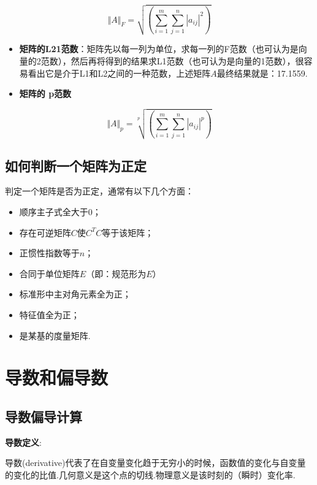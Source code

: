 \[
\Vert A\Vert_F=\sqrt{(\sum_{i=1}^m\sum_{j=1}^n{| a_{ij}|}^2)}
\]

\begin{itemize}
 
\item
  \textbf{矩阵的L21范数}：矩阵先以每一列为单位，求每一列的F范数（也可认为是向量的2范数），然后再将得到的结果求L1范数（也可认为是向量的1范数），很容易看出它是介于L1和L2之间的一种范数，上述矩阵\(A\)最终结果就是：17.1559.
\item
  \textbf{矩阵的 p范数}
\end{itemize}

\[
\Vert A\Vert_p=\sqrt[p]{(\sum_{i=1}^m\sum_{j=1}^n{| a_{ij}|}^p)}
\]

\subsection{如何判断一个矩阵为正定}\label{ux5982ux4f55ux5224ux65adux4e00ux4e2aux77e9ux9635ux4e3aux6b63ux5b9a}

判定一个矩阵是否为正定，通常有以下几个方面：

\begin{itemize}
 
\item
  顺序主子式全大于0；\\
\item
  存在可逆矩阵\(C\)使\(C^TC\)等于该矩阵；
\item
  正惯性指数等于\(n\)；
\item
  合同于单位矩阵\(E\)（即：规范形为\(E\)）
\item
  标准形中主对角元素全为正；
\item
  特征值全为正；
\item
  是某基的度量矩阵.
\end{itemize}

\section{导数和偏导数}\label{ux5bfcux6570ux548cux504fux5bfcux6570}

\subsection{导数偏导计算}\label{ux5bfcux6570ux504fux5bfcux8ba1ux7b97}

\textbf{导数定义}:

导数(derivative)代表了在自变量变化趋于无穷小的时候，函数值的变化与自变量的变化的比值.几何意义是这个点的切线.物理意义是该时刻的（瞬时）变化率.
​

